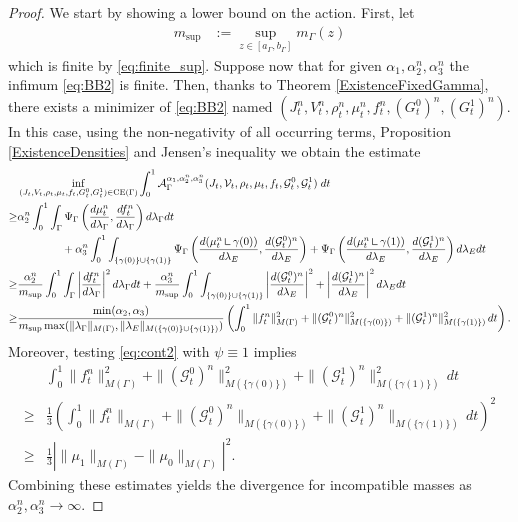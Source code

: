 \documentclass{article}
\def\calA{{\mathcal A}} \def\calB{{\mathcal B}} \def\calC{{\mathcal C}}
\def\calG{{\mathcal G}} \def\calH{{\mathcal H}} \def\calI{{\mathcal I}}
\newcommand{\mres}{\mathbin{\vrule height 1.4ex depth 0pt width
0.13ex\vrule height 0.13ex depth 0pt width 1.0ex}}
\begin{document}
\begin{proof}
    We start by showing a lower bound on the action. 
    First, let 
    \begin{align*}
        m_{\sup} &:= \sup\limits_{z\in[a_\Gamma, b_\Gamma]} m_\Gamma(z)
    \end{align*}
    which is finite by \eqref{eq:finite_sup}. 
    Suppose now that for given $\alpha_1,\alpha^n_2,\alpha^n_3$ the infimum \eqref{eq:BB2} is finite. Then, thanks to Theorem \ref{ExistenceFixedGamma}, there exists a minimizer of \eqref{eq:BB2} named $(J^n_t, V^n_t, \rho^n_t, \mu^n_t, f^n_t, (G^0_t)^n, (G^1_t)^n)$. In this case, 
    using the non-negativity of all occurring terms, Proposition \ref{ExistenceDensities} and Jensen's inequality we obtain the estimate
    \begin{align*}
        &\inf_{(J_t, V_t, \rho_t, \mu_t, f_t, G^0_t, G^1_t) \in {\rm CE}(\Gamma)}  \int_{0}^{1} \calA_\Gamma^{\alpha_1, \alpha_2^n, \alpha_3^n}(J_t, \mathcal{V}_t, \rho_t, \mu_t, f_t, \mathcal{G}_t^0, \mathcal{G}_t^1)\; dt \\
        \geq& \alpha_2^n \int_0^1 \int_\Gamma \Psi_\Gamma\left(\frac{d\mu^n_t}{d\lambda_\Gamma}, \frac{d f^n_t}{d\lambda_\Gamma} \right) d\lambda_\Gamma dt \\
        & \qquad \qquad + \alpha_3^n \int_0^1 \int_{\{\gamma(0)\} \cup \{\gamma(1)\}}\Psi_\Gamma\left(\frac{d(\mu^n_t \mres  \gamma(0))}{d\lambda_E}, \frac{d (\calG^0_t)^n}{d\lambda_E} \right) + \Psi_\Gamma\left(\frac{d(\mu^n_t \mres  \gamma(1))}{d\lambda_E}, \frac{d (\calG^1_t)^n}{d\lambda_E} \right) d\lambda_E dt\\
        \geq& \frac{\alpha_2^n}{m_{\sup}} \int_0^1 \int_\Gamma \left| \frac{df^n_t}{d\lambda_\Gamma} \right|^2 d\lambda_\Gamma dt + \frac{\alpha_3^n}{m_{\sup}} \int_0^1 \int_{\{\gamma(0)\} \cup \{\gamma(1)\}}\left| \frac{d(\calG^0_t)^n}{d\lambda_E} \right|^2 + \left| \frac{d(\calG^1_t)^n}{d\lambda_E}  \right|^2 d\lambda_E dt\\
        \geq& \frac{\min(\alpha_2, \alpha_3)}{m_{\sup} \max(\|\lambda_\Gamma\|_{M(\Gamma)}, \|\lambda_E\|_{M(\{\gamma(0)\} \cup \{\gamma(1)\})})} \left( \int_0^1 \|f^n_t\|_{M(\Gamma)}^2 + \|(\calG_t^0)^n\|_{M(\{\gamma(0)\})}^2 + \|(\calG^1_t)^n\|_{M(\{\gamma(1)\})}^2 \,dt \right).
    \end{align*}
    Moreover, testing \eqref{eq:cont2} with $\psi\equiv 1$ implies
    \begin{align*}
        &\int_0^1\|f^n_t\|^2_{M(\Gamma)} + \|(\calG^0_t)^n\|^2_{M(\{\gamma(0)\})} + \|(\calG^1_t)^n\|^2_{M(\{\gamma(1)\})}\, dt \\
        \geq& \frac{1}{3}\left(\int_0^1\|f^n_t\|_{M(\Gamma)} + \|(\calG^0_t)^n\|_{M(\{\gamma(0)\})} + \|(\calG^1_t)^n\|_{M(\{\gamma(1)\})}\, dt\right)^2 \\
        \geq& \frac{1}{3}\left| \|\mu_1\|_{M(\Gamma)} - \|\mu_0\|_{M(\Gamma)} \right|^2.
    \end{align*}
    Combining these estimates yields the divergence for incompatible masses as $\alpha^n_2, \alpha^n_3\to\infty$. 


\end{proof}
\end{document}
